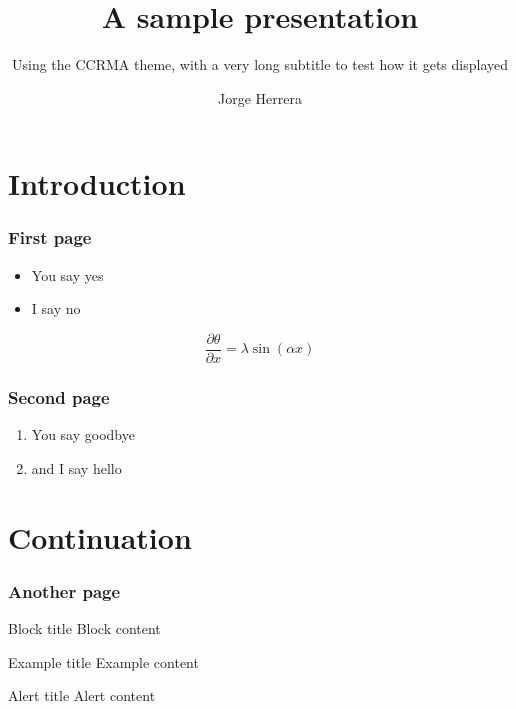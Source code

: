 \documentclass{beamer}
\title{A sample presentation}
\subtitle{Using the CCRMA theme, with a very long subtitle to test how it gets displayed}
\author{Jorge Herrera}
\date
\begin{document}
\cleantitlepage


\section[Intro]{Introduction}
\begin{frame}\frametitle{First page}
    \begin{itemize}
    \item You say yes
    \item I say no
    \end{itemize}

    \begin{equation}
    \frac{\partial \theta}{\partial x} = \lambda \sin(\alpha x)
    \end{equation}

\end{frame}

\begin{frame}\frametitle{Second page}
    \begin{enumerate}
    \item You say goodbye
    \item and I say hello
    \end{enumerate}
\end{frame}


\section[Cont]{Continuation}
\begin{frame}\frametitle{Another page}

    \begin{block}{Block title}
    Block content
    \end{block}

    \begin{example}{Example title}
    Example content
    \end{example}

    \begin{alertblock}{Alert title}
    Alert content
    \end{alertblock}

\end{frame}
\end{document}
